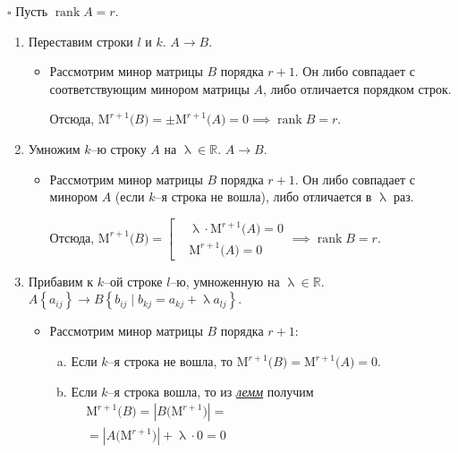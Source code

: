 \documentclass[12pt, a4paper]{report}
\DeclareMathOperator{\rank}{rank}
\begin{document}
	\(\square\) Пусть \(\rank A=r\).
	
	\begin{enumerate}[1)]
		\item Переставим строки \(l\) и \(k\). \(A\rightarrow B\).
		\begin{itemize}
			\item Рассмотрим минор матрицы \(B\) порядка \(r+1\). Он либо совпадает с соответствующим минором матрицы \(A\), либо отличается порядком строк. 
			
			Отсюда, \(\mathrm{M}^{r+1}\big(B\big)=\pm\mathrm{M}^{r+1}\big(A\big)=0\implies\rank B=r\).
		\end{itemize}
		\item Умножим \(k\)--ю строку \(A\) на \(\uplambda\in\mathbb{R}\). \(A\rightarrow B\).
		\begin{itemize}
			\item Рассмотрим минор матрицы \(B\) порядка \(r+1\). Он либо совпадает с минором \(A\) (если \(k\)--я строка не вошла), либо отличается в \(\uplambda\) раз.
			
			Отсюда, \(\mathrm{M}^{r+1}\big(B\big)=\left[\begin{aligned}&\uplambda\cdot\mathrm{M}^{r+1}\big(A\big)=0\\[2.5pt]&\mathrm{M}^{r+1}\big(A\big)=0\end{aligned}\right.\implies \rank B=r\).
		\end{itemize}
		\item Прибавим к \(k\)--ой строке \(l\)--ю, умноженную на \(\uplambda\in\mathbb{R}\). \(A\left\{a_{ij}\right\}\rightarrow B\left\{b_{ij}\mid b_{kj}=a_{kj}+\uplambda a_{lj}\right\}\).
		\begin{itemize}
			\item Рассмотрим минор матрицы \(B\) порядка \(r+1\):
			\begin{enumerate}[a)]
				\item Если \(k\)--я строка не вошла, то \(\mathrm{M}^{r+1}\big(B\big)=\mathrm{M}^{r+1}\big(A\big)=0\).
				\item Если \(k\)--я строка вошла, то из \hyperref[2.3]{\textit{\color{MMagenta}лемм}} получим \(\begin{aligned}&\mathrm{M}^{r+1}\big(B\big)=\left|B\big(\mathrm{M}^{r+1}\big)\right|=\\&=\left|A\big(\mathrm{M}^{r+1}\big)\right|+\uplambda\cdot 0=0\end{aligned}\)
			\end{enumerate}
		\end{itemize}
	\end{enumerate}
\end{document}

